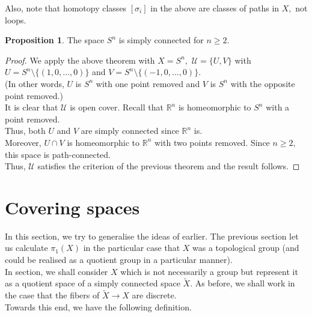 \documentclass[12pt]{article}
\theoremstyle{definition}
\numberwithin{thm}{section}
\newtheorem{prop}[thm]{Proposition}
\begin{document}
Also, note that homotopy classes $[\sigma_i]$ in the above are classes of paths in $X,$ not loops. 
\begin{prop} \label{prop:Snsimplyconnected}
	The space $S^n$ is simply connected for $n \ge 2.$
\end{prop}
\begin{proof} 
	We apply the above theorem with $X = S^n,$ $\mathcal{U} = \{U, V\}$ with $U = S^n\setminus\{(1, 0, \ldots, 0)\}$ and $V = S^n\setminus\{(-1, 0, \ldots, 0)\}.$\\
	(In other words, $U$ is $S^n$ with one point removed and $V$ is $S^n$ with the opposite point removed.)\\
	It is clear that $\mathcal{U}$ is open cover. Recall that $\mathbb{R}^n$ is homeomorphic to $S^n$ with a point removed.\\
	Thus, both $U$ and $V$ are simply connected since $\mathbb{R}^n$ is.\\
	Moreover, $U \cap V$ is homeomorphic to $\mathbb{R}^n$ with two points removed. Since $n \ge 2,$ this space is path-connected.\\
	Thus, $\mathcal{U}$ satisfies the criterion of the previous theorem and the result follows.
\end{proof}
%
\section{Covering spaces}
%
In this section, we try to generalise the ideas of earlier. The previous section let us calculate $\pi_1(X)$ in the particular case that $X$ was a topological group (and could be realised as a quotient group in a particular manner).\\
In section, we shall consider $X$ which is not necessarily a group but represent it as a quotient space of a simply connected space $\tilde{X}.$ As before, we shall work in the case that the fibers of $\tilde{X} \to X$ are discrete.\\
Towards this end, we have the following definition.
\end{document}
